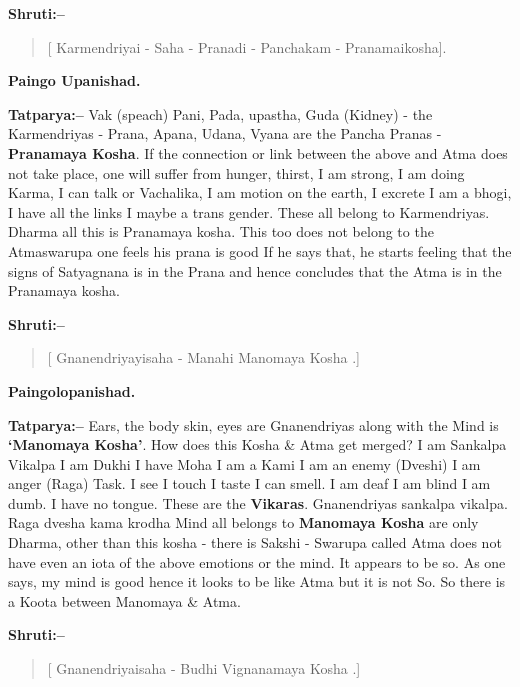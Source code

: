 \textbf{Shruti:–}

\begin{verse}
[ Karmendriyai - Saha - Pranadi - Panchakam - Pranamaikosha].
\end{verse}

\begin{flushright}
\textbf{Paingo Upanishad.}
\end{flushright}

\textbf{Tatparya:–} Vak (speach) Pani, Pada, upastha, Guda (Kidney) - the Karmendriyas - Prana, Apana, Udana, Vyana are the Pancha Pranas - \textbf{Pranamaya Kosha}. If the connection or link between the above and Atma does not take place, one will suffer from hunger, thirst, I am strong, I am doing Karma, I can talk or Vachalika, I am motion on the earth, I excrete I am a bhogi, I have all the links I maybe a trans gender. These all belong to Karmendriyas. Dharma all this is Pranamaya kosha. This too does not belong to the Atmaswarupa one feels his prana is good If he says that, he starts feeling that the signs of Satyagnana is in the Prana and hence concludes that the Atma is in the Pranamaya kosha.

\textbf{Shruti:–}

\begin{verse}
[ Gnanendriyayisaha - Manahi Manomaya Kosha .]
\end{verse}

\begin{flushright}
\textbf{Paingolopanishad.}
\end{flushright}

\textbf{Tatparya:–} Ears, the body skin, eyes are Gnanendriyas along with the Mind is \textbf{‘Manomaya Kosha’}. How does this Kosha \& Atma get merged? I am Sankalpa Vikalpa I am Dukhi I have Moha I am a Kami I am an enemy (Dveshi) I am anger (Raga) Task. I see I touch I taste I can smell. I am deaf I am blind I am dumb. I have no tongue. These are the \textbf{Vikaras}. Gnanendriyas sankalpa vikalpa. Raga dvesha kama krodha Mind all belongs to \textbf{Manomaya Kosha} are only Dharma, other than this kosha - there is Sakshi - Swarupa called Atma does not have even an iota of the above emotions or the mind. It appears to be so. As one says, my mind is good hence it looks to be like Atma but it is not So. So there is a Koota between Manomaya \& Atma.

\textbf{Shruti:–}

\begin{verse}
[ Gnanendriyaisaha - Budhi Vignanamaya Kosha .]
\end{verse}

